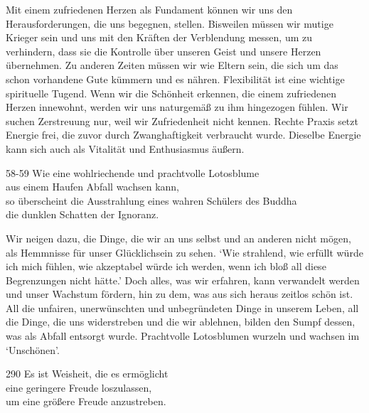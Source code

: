 \begin{dhpRefl}

Mit einem zufriedenen Herzen als Fundament können wir uns den
Herausforderungen, die uns begegnen, stellen. Bisweilen müssen wir mutige
Krieger sein und uns mit den Kräften der Verblendung messen, um zu verhindern,
dass sie die Kontrolle über unseren Geist und unsere Herzen übernehmen. Zu
anderen Zeiten müssen wir wie Eltern sein, die sich um das schon vorhandene
Gute kümmern und es nähren. Flexibilität ist eine wichtige spirituelle Tugend.
Wenn wir die Schönheit erkennen, die einem zufriedenen Herzen innewohnt,
werden wir uns naturgemäß zu ihm hingezogen fühlen. Wir suchen Zerstreuung
nur, weil wir Zufriedenheit nicht kennen. Rechte Praxis setzt Energie frei,
die zuvor durch Zwanghaftigkeit verbraucht wurde. Dieselbe Energie kann sich
auch als Vitalität und Enthusiasmus äußern.

\end{dhpRefl}


\begin{dhpVerse}{58-59}
\label{dhp-58}\label{dhp-59}
Wie eine wohlriechende und prachtvolle Lotosblume\\ 
aus einem Haufen Abfall wachsen kann,\\ 
so überscheint die Ausstrahlung eines wahren Schülers des Buddha\\ 
die dunklen Schatten der Ignoranz. 
\end{dhpVerse}

\begin{dhpRefl}

Wir neigen dazu, die Dinge, die wir an uns selbst und an anderen nicht mögen,
als Hemmnisse für unser Glücklichsein zu sehen. `Wie strahlend, wie erfüllt
würde ich mich fühlen, wie akzeptabel würde ich werden, wenn ich bloß all
diese Begrenzungen nicht hätte.' Doch alles, was wir erfahren, kann verwandelt
werden und unser Wachstum fördern, hin zu dem, was aus sich heraus zeitlos
schön ist. All die unfairen, unerwünschten und unbegründeten Dinge in unserem
Leben, all die Dinge, die uns widerstreben und die wir ablehnen, bilden den
Sumpf dessen, was als Abfall entsorgt wurde. Prachtvolle Lotosblumen wurzeln
und wachsen im `Unschönen'.

\end{dhpRefl}


\begin{dhpVerse}{290}
\label{dhp-290}
Es ist Weisheit, die es ermöglicht\\ 
eine geringere Freude loszulassen,\\ 
um eine größere Freude anzustreben. 
\end{dhpVerse}

